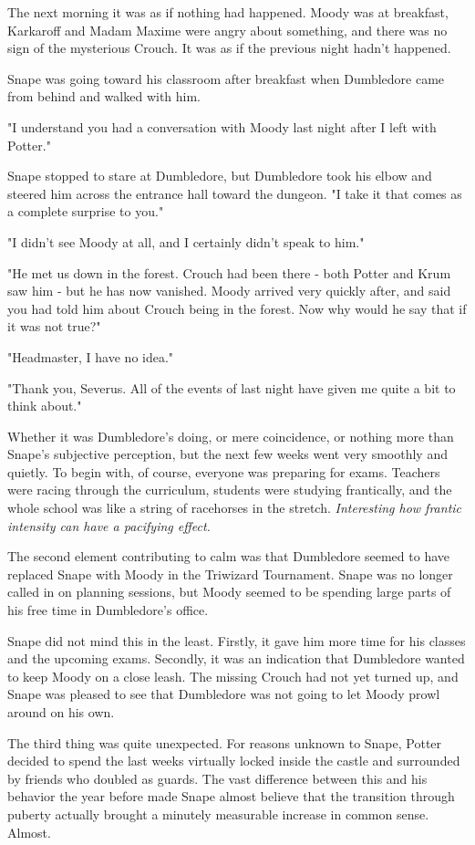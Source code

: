 The next morning it was as if nothing had happened. Moody was at breakfast, Karkaroff and Madam Maxime were angry about something, and there was no sign of the mysterious Crouch. It was as if the previous night hadn't happened.

Snape was going toward his classroom after breakfast when Dumbledore came from behind and walked with him.

"I understand you had a conversation with Moody last night after I left with Potter."

Snape stopped to stare at Dumbledore, but Dumbledore took his elbow and steered him across the entrance hall toward the dungeon. "I take it that comes as a complete surprise to you."

"I didn't see Moody at all, and I certainly didn't speak to him."

"He met us down in the forest. Crouch had been there - both Potter and Krum saw him - but he has now vanished. Moody arrived very quickly after, and said you had told him about Crouch being in the forest. Now why would he say that if it was not true?"

"Headmaster, I have no idea."

"Thank you, Severus. All of the events of last night have given me quite a bit to think about."

Whether it was Dumbledore's doing, or mere coincidence, or nothing more than Snape's subjective perception, but the next few weeks went very smoothly and quietly. To begin with, of course, everyone was preparing for exams. Teachers were racing through the curriculum, students were studying frantically, and the whole school was like a string of racehorses in the stretch. \emph{Interesting how frantic intensity can have a pacifying effect.}

The second element contributing to calm was that Dumbledore seemed to have replaced Snape with Moody in the Triwizard Tournament. Snape was no longer called in on planning sessions, but Moody seemed to be spending large parts of his free time in Dumbledore's office.

Snape did not mind this in the least. Firstly, it gave him more time for his classes and the upcoming exams. Secondly, it was an indication that Dumbledore wanted to keep Moody on a close leash. The missing Crouch had not yet turned up, and Snape was pleased to see that Dumbledore was not going to let Moody prowl around on his own.

The third thing was quite unexpected. For reasons unknown to Snape, Potter decided to spend the last weeks virtually locked inside the castle and surrounded by friends who doubled as guards. The vast difference between this and his behavior the year before made Snape almost believe that the transition through puberty actually brought a minutely measurable increase in common sense. Almost.

